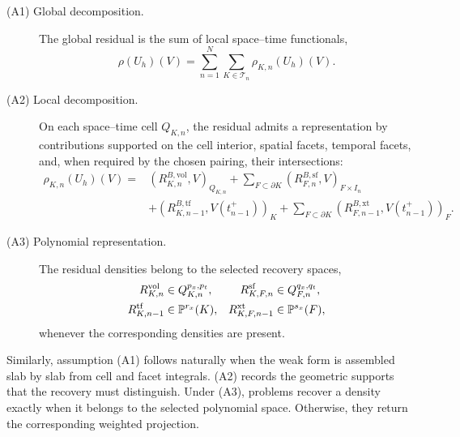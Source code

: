 \begin{description}
  \item[(A1) Global decomposition.] The global residual is the sum of local space–time functionals,
  \begin{equation}
    \rho(U_h)(V)
    =
    \sum_{n=1}^{N}
    \sum_{K\in\mathcal T_n}
    \rho_{K,n}(U_h)(V).
    \label{eq:space-time-residual-decomposition}
  \end{equation}

  \item[(A2) Local decomposition.] On each space--time cell \(Q_{K,n}\), the residual admits a representation by contributions supported on the cell interior, spatial facets, temporal facets, and, when required by the chosen pairing, their intersections:
  \begin{equation}
    \begin{aligned}
    \rho_{K,n}(U_h)(V)
    ={}&
    (R_{K,n}^{B,\mathrm{vol}},V)_{Q_{K,n}}
    +
    \sum_{F\subset\partial K}
    (R_{F,n}^{B,\mathrm{sf}},V)_{F\times I_n}
    \\
    &+
    (R_{K,n-1}^{B,\mathrm{tf}},V(t_{n-1}^{+}))_{K} +
    \sum_{F\subset\partial K}
    (R_{F,n-1}^{B,\mathrm{xt}},
      V(t_{n-1}^{+}))_{F}.
    \end{aligned}
    \label{eq:space-time-entity-representation}
  \end{equation}
  
\item[(A3) Polynomial representation.]
The residual densities belong to the selected recovery spaces,
\begin{align}
  R_{K,n}^{\mathrm{vol}}
  &\in Q_{K,n}^{p_x,p_t},
  &
  R_{K,F,n}^{\mathrm{sf}}
  &\in Q_{F,n}^{q_x,q_t},
  \notag\\
  R_{K,n-1}^{\mathrm{tf}}
  &\in \mathbb P^{r_x}(K),
  &
  R_{K,F,n-1}^{\mathrm{xt}}
  &\in \mathbb P^{s_x}(F),
  \label{eq:space-time-polynomial-representability}
\end{align}
whenever the corresponding densities are present.
\end{description}

Similarly, assumption (A1) follows naturally when the weak form is assembled slab by slab from cell and facet integrals. (A2) records the geometric supports that the recovery must distinguish. Under (A3), problems recover a density exactly when it belongs to the selected polynomial space. Otherwise, they return the corresponding weighted projection.



